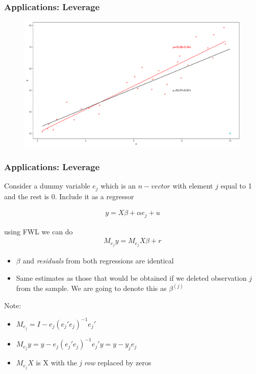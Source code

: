 \documentclass[
  shownotes,
  xcolor={svgnames},
  hyperref={colorlinks,citecolor=DarkBlue,linkcolor=DarkRed,urlcolor=DarkBlue}
  , aspectratio=169]{beamer}
\begin{document}
\begin{frame}
\frametitle{Applications: Leverage}

\begin{figure}[H] \centering
  \centering
  \includegraphics[scale=0.35]{figures/fig_1d.pdf}
  \\
  \tiny
\end{figure}
\end{frame}

\begin{frame}
\frametitle{Applications: Leverage}

Consider a dummy variable $e_j$ which is an $n-vector$ with element $j$ equal to 1 and the rest is 0. 
Include it as a regressor

\begin{align}
y =X\beta+\alpha e_j +u
\end{align}

using FWL we can do 
\begin{align}
M_{e_j} y =M_{e_j} X\beta + r
\end{align}

\begin{itemize}
  \footnotesize
\item $\beta$ and {\it residuals} from both regressions are identical
\item Same estimates as those that would be obtained if we deleted observation $j$ from the sample. We are going to denote this as $\beta^{(j)}$
\end{itemize}

\begin{tiny}
Note: 
\begin{itemize}
\item $M_{e_j}=I-e_j(e_j'e_j)^{-1}e_j'$
\item  $M_{e_j} y = y-e_j(e_j'e_j)^{-1}e_j' y= y-y_je_j$
\item  $M_{e_j} X$ is X with the {\it j row } replaced by zeros
\end{itemize}
\end{tiny}

\end{frame}
\end{document}
